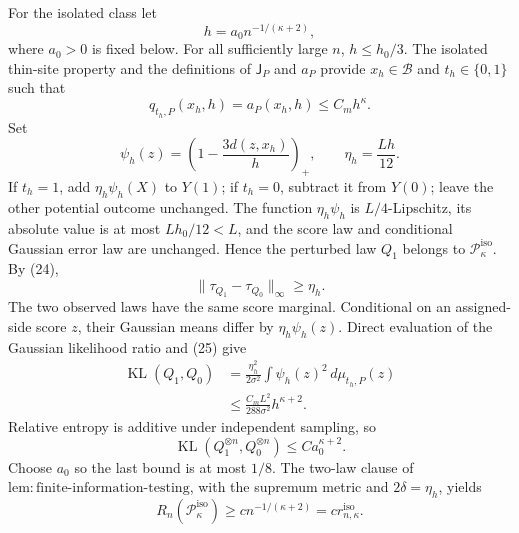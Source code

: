 For the isolated class let
\[
 h=a_0n^{-1/(\kappa+2)},
\]
where \(a_0>0\) is fixed below.  For all sufficiently large \(n\),
\(h\le h_0/3\).  The isolated thin-site property and the definitions of
\(\mathsf J_P\) and \(a_P\) provide \(x_h\in\mathcal B\) and
\(t_h\in\{0,1\}\) such that
\[
 q_{t_h,P}(x_h,h)=a_P(x_h,h)\le C_mh^{\kappa}. \tag{25}
\]
Set
\[
 \psi_h(z)=\left(1-\frac{3d(z,x_h)}h\right)_+,
 \qquad \eta_h=\frac{Lh}{12}.
\]
If \(t_h=1\), add \(\eta_h\psi_h(X)\) to \(Y(1)\); if \(t_h=0\),
subtract it from \(Y(0)\); leave the other potential outcome unchanged.
The function \(\eta_h\psi_h\) is \(L/4\)-Lipschitz, its absolute value
is at most \(Lh_0/12<L\), and the score law and conditional Gaussian
error law are unchanged.  Hence the perturbed law \(Q_1\) belongs to
\(\mathcal P_{\kappa}^{\mathrm{iso}}\).  By (24),
\[
 \lVert\tau_{Q_1}-\tau_{Q_0}\rVert_{\infty}\ge\eta_h. \tag{26}
\]
The two observed laws have the same score marginal.  Conditional on an
assigned-side score \(z\), their Gaussian means differ by
\(\eta_h\psi_h(z)\).  Direct evaluation of the Gaussian likelihood ratio
and (25) give
\[
 \begin{aligned}
 \operatorname{KL}(Q_1,Q_0)
 &=\frac{\eta_h^2}{2\sigma^2}
   \int\psi_h(z)^2\,d\mu_{t_h,P}(z)\\
 &\le\frac{C_mL^2}{288\sigma^2}h^{\kappa+2}.
 \end{aligned} \tag{27}
\]
Relative entropy is additive under independent sampling, so
\[
 \operatorname{KL}(Q_1^{\otimes n},Q_0^{\otimes n})
 \le C a_0^{\kappa+2}.
\]
Choose \(a_0\) so the last bound is at most \(1/8\).  The two-law clause
of \(\mathrm{lem:finite\text{-}information\text{-}testing}\), with the
supremum metric and \(2\delta=\eta_h\), yields
\[
 R_n(\mathcal P_{\kappa}^{\mathrm{iso}})
 \ge c n^{-1/(\kappa+2)}
 =c r_{n,\kappa}^{\mathrm{iso}}. \tag{28}
\]

